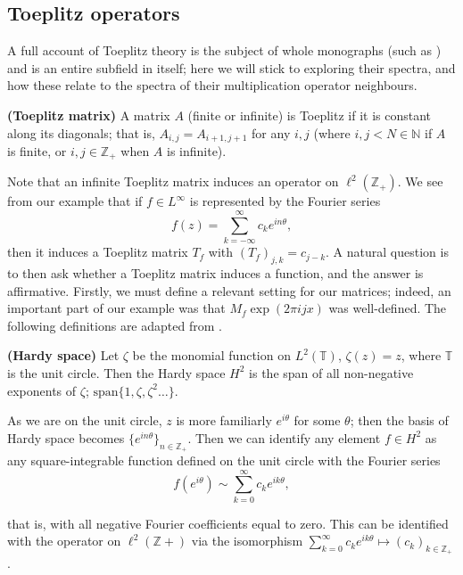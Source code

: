 \documentclass[../main.tex]{subfiles}
\begin{document}
\subsection{Toeplitz operators}\label{sec:toeplitz}

A full account of Toeplitz theory is the subject
of whole monographs (such as \parencite{bottcher1990analysis}) and is an entire
subfield in itself; here we will stick to exploring their spectra, and how these
relate to the spectra of their multiplication operator neighbours. 

\begin{definition}{\textbf{(Toeplitz matrix)}}
  A matrix $A$ (finite or infinite) is Toeplitz if it is constant along its
  diagonals; that is, $A_{i,j} = A_{i+1,j+1}$ for any $i, j$ (where $i,j <
  N \in \mathbb{N}$ if $A$ is finite, or $i,j \in \mathbb{Z}_+$ when $A$
  is infinite).
\end{definition}

Note that an infinite Toeplitz matrix induces an operator on
$\ell^2(\mathbb{Z}_+)$. We see from our example that if $f \in L^\infty$ is
represented by the Fourier series
$$f(z) = \sum_{k=-\infty}^{\infty} c_k e^{i n \theta},$$
then it induces a Toeplitz matrix $T_f$ with $(T_f)_{j,k} = c_{j-k}$. A natural
question is to then ask whether a Toeplitz matrix induces a function, and the
answer is affirmative. Firstly, we must define a relevant setting for our
matrices; indeed, an important part of our
example was that $M_f \exp(2 \pi i j x)$ was well-defined. The following
definitions are adapted from \parencite{arveson2002short}.

\begin{definition}{\textbf{(Hardy space)}}
  Let $\zeta$ be the monomial function on $L^2(\mathbb{T})$, $\zeta(z) = z$, where
  $\mathbb{T}$ is the unit circle. Then the Hardy space $H^2$ is the span
  of all non-negative exponents of $\zeta$; $\text{span}\{1, \zeta,
  \zeta^2 \hdots\}$.
\end{definition}

As we are on the unit circle, $z$ is more familiarly $e^{i \theta}$ for some
$\theta$; then the basis of Hardy space becomes $\{e^{i n \theta}\}_{n \in
\mathbb{Z}_+}$. Then we can identify any element $f \in H^2$ as any
square-integrable function defined on the unit circle with the Fourier series
$$f(e^{i \theta}) \sim \sum_{k=0}^\infty c_k e^{i k \theta},$$

that is, with all negative Fourier coefficients equal to zero. This can be
identified with the operator on $\ell^2(\mathbb{Z}+)$ via the isomorphism
$\sum_{k=0}^\infty c_k e^{i k \theta} \mapsto (c_k)_{k \in \mathbb{Z}_+}$
\parencite{bottcher1990analysis}.
\end{document}
